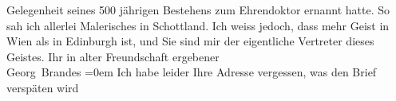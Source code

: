 \begin{ledgroupsized}[t]{13cm}
{{{                  Gelegenheit}}}\label{K_L02033_3h} seines 500 jährigen Bestehens zum Ehrendoktor ernannt hatte. So
               sah ich allerlei Malerisches in Schottland.\pend
           \pstart
           Ich weiss jedoch, dass mehr Geist in Wien als in Edinburgh ist, und Sie sind mir der eigentliche
               Vertreter dieses Geistes.\pend
           \pstart
           Ihr in alter Freundschaft ergebener{\\[\baselineskip]}\spacefill\mbox{Georg Brandes}\pend
           \leftskip=0em{}\pstart
           \noindent{}Ich habe leider Ihre Adresse vergessen, was den Brief verspäten wird\pend
           
         
         \endnumbering{}\end{ledgroupsized}  \newcommand{\dateiname}{L02033}\newcommand{\titel}{Georg Brandes an Arthur Schnitzler, 6. 10. 1911}\newcommand{\editorInnen}{Martin Anton Müller und Gerd-Hermann Susen}
      